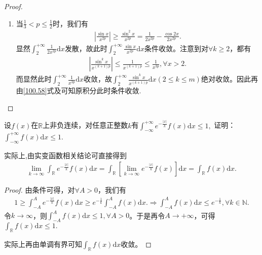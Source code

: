 \documentclass[../../main.tex]{subfiles}
\begin{document}
\begin{proof}
\begin{enumerate}
\begin{enumerate}
\item 当\(\frac{1}{3}<p\leqslant \frac{1}{2}\)时，我们有
\begin{align*}
\left|\frac{\sin x}{x^{2p}}\right|\geqslant\frac{\sin^2 x}{x^{2p}}=\frac{1}{2x^{2p}}-\frac{\cos 2x}{2x^{2p}}.
\end{align*}
显然\(\int_{2}^{+\infty}\frac{1}{2x^{2p}}\mathrm{d}x\)发散，故此时\(\int_{2}^{+\infty}\frac{\sin x}{x^{2p}}\mathrm{d}x\)条件收敛。注意到对\(\forall k\geqslant 2\)，都有
\begin{align*}
\left|\frac{\sin^k x}{x^{(k + 1)p}}\right|\leqslant\frac{1}{x^{(k + 1)p}}\leqslant\frac{1}{x^{3p}},\forall x > 2.
\end{align*}
而显然此时\(\int_{2}^{+\infty}\frac{1}{x^{3p}}\mathrm{d}x\)收敛，故\(\int_{2}^{+\infty}\frac{\sin^k x}{x^{(k + 1)p}}\mathrm{d}x(2\leq k\leq m)\)绝对收敛。因此再由\eqref{100.58}式及可知原积分此时条件收敛.
\end{enumerate} 
\end{enumerate}
\end{proof}

\begin{example}
设\(f(x)\)在\(\mathbb{R}\)上非负连续，对任意正整数\(k\)有$\int_{-\infty}^{+\infty} e^{-\frac{|x|}{k}}f(x)\mathrm{d}x \leq 1,$
证明：$\int_{-\infty}^{+\infty}f(x)\mathrm{d}x \leq 1.$
\end{example}
\begin{remark}
实际上,由实变函数相关结论可直接得到
\begin{align*}
\lim_{k\rightarrow \infty}\int_{\mathbb{R}}e^{-\frac{| x |}{k}}f( x ) \mathrm{d}x=\int_{\mathbb{R}}\left[ \lim_{k\rightarrow \infty}e^{-\frac{| x |}{k}}f( x ) \right] \mathrm{d}x=\int_{\mathbb{R}}f( x ) \mathrm{d}x.
\end{align*}
\end{remark}
\begin{proof}
由条件可得，对$\forall A>0$，我们有
\begin{align*}
1\geqslant \int_{-A}^Ae^{-\frac{| x |}{k}}f( x ) \mathrm{d}x\geqslant e^{-\frac{1}{k}}\int_{-A}^Af( x ) \mathrm{d}x.\Rightarrow \int_{-A}^Af( x ) \mathrm{d}x\leqslant e^{-\frac{1}{k}},\forall k\in \mathbb{N} .
\end{align*}
令$k\rightarrow \infty$，则$\int_{-A}^Af( x ) \mathrm{d}x\leqslant 1,\forall A>0$。于是再令$A\rightarrow +\infty$，可得$\int_{\mathbb{R}}f( x ) \mathrm{d}x\leqslant 1.$

实际上再由单调有界可知$\int_{\mathbb{R}}f( x ) \mathrm{d}x$收敛。
\end{proof}
\end{document}
